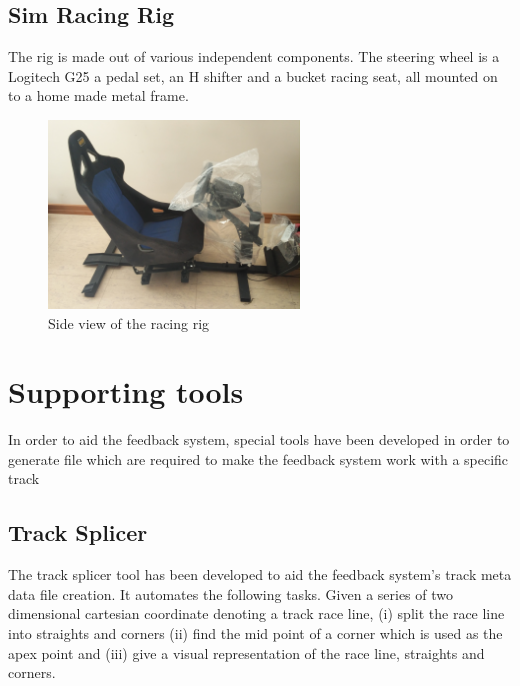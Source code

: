 \subsection{Sim Racing Rig}
\label{sec:imp-simRacingRig}
The rig is made out of various independent components. The steering wheel is a Logitech G25 a pedal set, an H shifter and a bucket racing seat, all mounted on to a home made metal frame.

\begin{figure}[!htb]
	\centering
	\includegraphics[height=5cm]{images/RacingRig}
	\caption{Side view of the racing rig}
	\label{fig:RacingRig}
\end{figure}

\section{Supporting tools}
\label{sec:imp-supportingTools}
In order to aid the feedback system, special tools have been developed in order to generate file which are required to make the feedback system work with a specific track

\subsection{Track Splicer}
\label{sec:imp-trackSplicer}
The track splicer tool has been developed to aid the feedback system's track meta data file creation. It automates the following tasks. Given a series of two dimensional cartesian coordinate denoting a track race line, (i) split the race line into straights and corners (ii) find the mid point of a corner which is used as the apex point and (iii) give a visual representation of the race line, straights and corners. 

